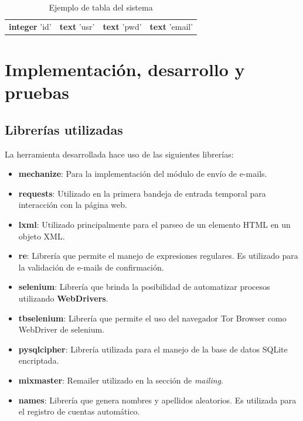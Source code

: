 \begin{table}[H]
	\centering
	\label{tabla}
	\begin{tabular}{|c|c|c|c|}
		\hline
		\rowcolor[HTML]{BBDAFF} 
		\multicolumn{4}{|c|}{\cellcolor[HTML]{BBDAFF}'facebook'} \\ \hline
		\rowcolor[HTML]{ECF4FF} 
		\textbf{integer} 'id'    & \textbf{text} 'usr'   & \textbf{text} 'pwd'   & \textbf{text} 'email'   \\ \hline
	\end{tabular}
	\caption{Ejemplo de tabla del sistema}
\end{table}

\section{Implementación, desarrollo y pruebas}
\subsection{Librerías utilizadas}

La herramienta desarrollada hace uso de las siguientes librerías:

\begin{itemize}
	\item \textbf{mechanize}: Para la implementación del módulo de envío de e-mails.
	\item \textbf{requests}: Utilizado en la primera bandeja de entrada temporal para interacción con la página web.
	\item \textbf{lxml}: Utilizado principalmente para el parseo de un elemento HTML en un objeto XML.
	\item \textbf{re}: Librería que permite el manejo de expresiones regulares. Es utilizado para la validación de e-mails de confirmación.
	\item \textbf{selenium}: Librería que brinda la posibilidad de automatizar procesos utilizando \textbf{WebDrivers}.
	\item \textbf{tbselenium}: Librería que permite el uso del navegador Tor Browser como WebDriver de selenium.	
	\item \textbf{pysqlcipher}: Librería utilizada para el manejo de la base de datos SQLite encriptada.	
	\item \textbf{mixmaster}: Remailer utilizado en la sección de \textit{mailing}.
	\item \textbf{names}: Librería que genera nombres y apellidos aleatorios.	Es utilizada para el registro de cuentas automático.
\end{itemize}

